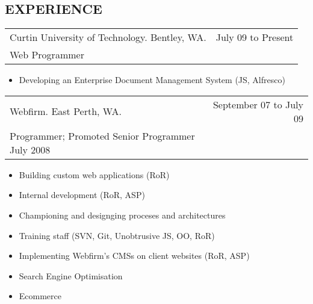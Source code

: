 \documentclass[margin]{res}
\begin{document}
\begin{resume}

  \section{EXPERIENCE}
  \begin{tabular}{p{3.5in} r}
    Curtin University of Technology. Bentley, WA.  & July 09 to Present \\
    Web Programmer
  \end{tabular}	
  \begin{itemize}
  \item Developing an Enterprise Document
    Management System (JS, Alfresco)
  \end{itemize} 

  \begin{tabular}{p{3.5in} r}
    Webfirm. East Perth, WA. & September 07 to July 09 \\
    Programmer; Promoted Senior Programmer July 2008
  \end{tabular}	
  \begin{itemize}
  \item Building custom web applications (RoR)
  \item Internal development (RoR, ASP)
  \item Championing and designging proceses and
    architectures
  \item Training staff (SVN, Git, Unobtrusive JS,
    OO, RoR)
  \item Implementing Webfirm's CMSs on client
    websites (RoR, ASP)
  \item Search Engine Optimisation
  \item Ecommerce
  \end{itemize} 


\end{resume}
\end{document}

